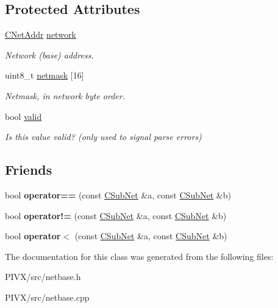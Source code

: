 \subsection*{Protected Attributes}
\begin{DoxyCompactItemize}
\item 
\mbox{\label{class_c_sub_net_a17c8e899bfed76a371c833fb4cd679c9}} 
\mbox{\hyperlink{class_c_net_addr}{C\+Net\+Addr}} \mbox{\hyperlink{class_c_sub_net_a17c8e899bfed76a371c833fb4cd679c9}{network}}
\begin{DoxyCompactList}\small\item\em Network (base) address. \end{DoxyCompactList}\item 
\mbox{\label{class_c_sub_net_a7ba6fc57a4ddcddfa3f3355cc3e56adc}} 
uint8\+\_\+t \mbox{\hyperlink{class_c_sub_net_a7ba6fc57a4ddcddfa3f3355cc3e56adc}{netmask}} \mbox{[}16\mbox{]}
\begin{DoxyCompactList}\small\item\em Netmask, in network byte order. \end{DoxyCompactList}\item 
\mbox{\label{class_c_sub_net_a01fbc9843041de802baeaf4d6e4bbcc5}} 
bool \mbox{\hyperlink{class_c_sub_net_a01fbc9843041de802baeaf4d6e4bbcc5}{valid}}
\begin{DoxyCompactList}\small\item\em Is this value valid? (only used to signal parse errors) \end{DoxyCompactList}\end{DoxyCompactItemize}
\subsection*{Friends}
\begin{DoxyCompactItemize}
\item 
\mbox{\label{class_c_sub_net_a386ec849433fb808a6f5a4f97893b4cd}} 
bool {\bfseries operator==} (const \mbox{\hyperlink{class_c_sub_net}{C\+Sub\+Net}} \&a, const \mbox{\hyperlink{class_c_sub_net}{C\+Sub\+Net}} \&b)
\item 
\mbox{\label{class_c_sub_net_a009219cad6ef9a6d6da9b9a876e43b9d}} 
bool {\bfseries operator!=} (const \mbox{\hyperlink{class_c_sub_net}{C\+Sub\+Net}} \&a, const \mbox{\hyperlink{class_c_sub_net}{C\+Sub\+Net}} \&b)
\item 
\mbox{\label{class_c_sub_net_ac6349c0d4257d2d013e3cd8f72303975}} 
bool {\bfseries operator$<$} (const \mbox{\hyperlink{class_c_sub_net}{C\+Sub\+Net}} \&a, const \mbox{\hyperlink{class_c_sub_net}{C\+Sub\+Net}} \&b)
\end{DoxyCompactItemize}


The documentation for this class was generated from the following files\+:\begin{DoxyCompactItemize}
\item 
P\+I\+V\+X/src/netbase.\+h\item 
P\+I\+V\+X/src/netbase.\+cpp\end{DoxyCompactItemize}
